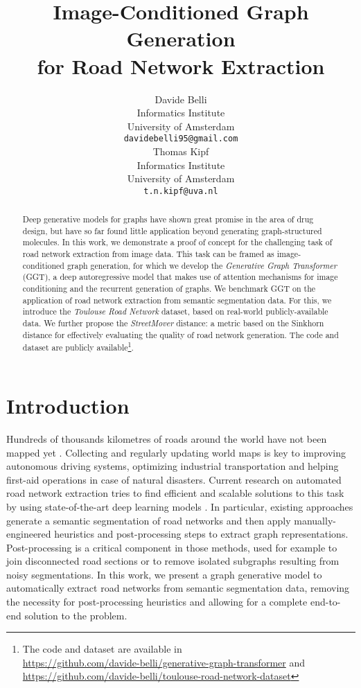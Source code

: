 \documentclass{article}
\title{Image-Conditioned Graph Generation \\ for Road Network Extraction}
\author{
Davide Belli \\ Informatics Institute \\
University of Amsterdam \\
  \texttt{davidebelli95@gmail.com} \\
    \And
  Thomas Kipf \\
Informatics Institute \\
University of Amsterdam \\
  \texttt{t.n.kipf@uva.nl} \\
}
\begin{document}
\maketitle

\vskip -0.15in
\begin{abstract}

    
Deep generative models for graphs have shown great promise in the area of drug design, but have so far found little application beyond generating graph-structured molecules. In this work, we demonstrate a proof of concept for the challenging task of road network extraction from image data. This task can be framed as image-conditioned graph generation, for which we develop the \textit{Generative Graph Transformer} (GGT), a deep autoregressive model that makes use of attention mechanisms for image conditioning and the recurrent generation of graphs. We benchmark GGT on the application of road network extraction from semantic segmentation data. For this, we introduce the \textit{Toulouse Road Network} dataset, based on real-world publicly-available data. We further propose the \textit{StreetMover} distance: a metric based on the Sinkhorn distance for effectively evaluating the quality of road network generation. The code and dataset are publicly available\footnote{The code and dataset are available in \\ \url{https://github.com/davide-belli/generative-graph-transformer} and \\ \url{https://github.com/davide-belli/toulouse-road-network-dataset}}.
    
\end{abstract}

\vskip -0.15in
\section{Introduction}

Hundreds of thousands kilometres of roads around the world have not been mapped yet \citep{barrington2017world}. Collecting and regularly updating world maps is key to improving autonomous driving systems, optimizing industrial transportation and helping first-aid operations in case of natural disasters. Current research on automated road network extraction tries to find efficient and scalable solutions to this task by using state-of-the-art deep learning models \citep{he2016deep,ronneberger2015u,chen2018encoder}. In particular, existing approaches \citep{gao2019road,henry2018road,muruganandham2016semantic,van2018spacenet,mapwithai} generate a semantic segmentation of road networks and then apply manually-engineered heuristics and post-processing steps to extract graph representations. Post-processing is a critical component in those methods, used for example to join disconnected road sections or to remove isolated subgraphs resulting from noisy segmentations. In this work, we present a graph generative model to automatically extract road networks from semantic segmentation data, removing the necessity for post-processing heuristics and allowing for a complete end-to-end solution to the problem.
\end{document}
